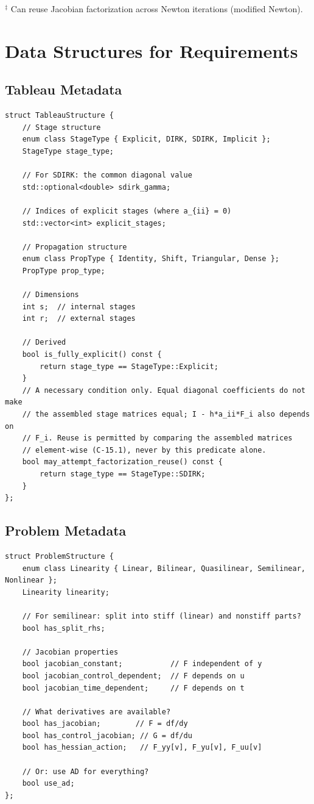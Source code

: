 \documentclass[11pt]{article}
\begin{document}
$^\ddagger$ Can reuse Jacobian factorization across Newton iterations (modified Newton).

\section{Data Structures for Requirements}

\subsection{Tableau Metadata}

\begin{verbatim}
struct TableauStructure {
    // Stage structure
    enum class StageType { Explicit, DIRK, SDIRK, Implicit };
    StageType stage_type;
    
    // For SDIRK: the common diagonal value
    std::optional<double> sdirk_gamma;
    
    // Indices of explicit stages (where a_{ii} = 0)
    std::vector<int> explicit_stages;
    
    // Propagation structure  
    enum class PropType { Identity, Shift, Triangular, Dense };
    PropType prop_type;
    
    // Dimensions
    int s;  // internal stages
    int r;  // external stages
    
    // Derived
    bool is_fully_explicit() const { 
        return stage_type == StageType::Explicit; 
    }
    // A necessary condition only. Equal diagonal coefficients do not make
    // the assembled stage matrices equal; I - h*a_ii*F_i also depends on
    // F_i. Reuse is permitted by comparing the assembled matrices
    // element-wise (C-15.1), never by this predicate alone.
    bool may_attempt_factorization_reuse() const {
        return stage_type == StageType::SDIRK;
    }
};
\end{verbatim}

\subsection{Problem Metadata}

\begin{verbatim}
struct ProblemStructure {
    enum class Linearity { Linear, Bilinear, Quasilinear, Semilinear, Nonlinear };
    Linearity linearity;
    
    // For semilinear: split into stiff (linear) and nonstiff parts?
    bool has_split_rhs;
    
    // Jacobian properties
    bool jacobian_constant;           // F independent of y
    bool jacobian_control_dependent;  // F depends on u
    bool jacobian_time_dependent;     // F depends on t
    
    // What derivatives are available?
    bool has_jacobian;        // F = df/dy
    bool has_control_jacobian; // G = df/du  
    bool has_hessian_action;   // F_yy[v], F_yu[v], F_uu[v]
    
    // Or: use AD for everything?
    bool use_ad;
};
\end{verbatim}
\end{document}
